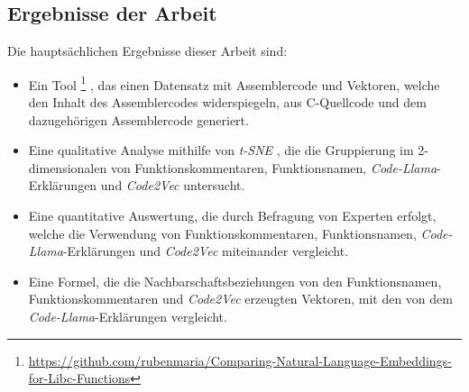 \documentclass[12pt,letterpaper,ngerman]{article}
\begin{document}
\subsection{Ergebnisse der Arbeit}
Die hauptsächlichen Ergebnisse dieser Arbeit sind:
\begin{itemize}
  \item Ein Tool
    \footnote{\url{https://github.com/rubenmaria/Comparing-Natural-Language-Embeddings-for-Libc-Functions}}
    , das einen Datensatz mit Assemblercode und
    Vektoren, welche den Inhalt des Assemblercodes widerspiegeln,
    aus C-Quellcode und dem dazugehörigen Assemblercode generiert.

  \item Eine qualitative Analyse mithilfe von
    \textit{t-SNE} \cite{JMLR:v9:vandermaaten08a}, die die
    Gruppierung im 2-dimensionalen von 
    Funktionskommentaren, Funktionsnamen, 
    \textit{Code-Llama}-Erklärungen
    \cite{rozière2024codellamaopenfoundation}
    und  \textit{Code2Vec}  \cite{code2vec}
    untersucht.
  \item Eine quantitative Auswertung, die durch Befragung von 
    Experten erfolgt, welche die Verwendung von Funktionskommentaren,
    Funktionsnamen, \textit{Code-Llama}-Erklärungen und 
    \textit{Code2Vec}  miteinander vergleicht.
  \item Eine Formel, die die Nachbarschaftsbeziehungen von
    den Funktionsnamen, Funktionskommentaren  und 
    \textit{Code2Vec} erzeugten Vektoren, 
    mit den von dem \textit{Code-Llama}-Erklärungen vergleicht.
\end{itemize}
\pagebreak
\end{document}
